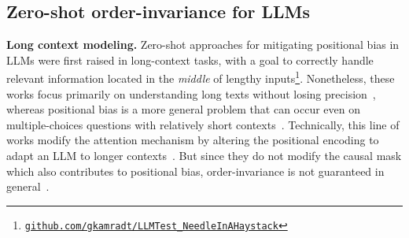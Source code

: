 \subsection{Zero-shot order-invariance for LLMs}
\label{related_work:orderinv}
\textbf{Long context modeling.} Zero-shot approaches for mitigating positional bias in LLMs were first raised in long-context tasks, with a goal to correctly handle relevant information located in the \textit{middle} of lengthy inputs\footnote{\href{https://github.com/gkamradt/LLMTest_NeedleInAHaystack}{\texttt{github.com/gkamradt/LLMTest\_NeedleInAHaystack}}}. Nonetheless, these works focus primarily on understanding long texts without losing precision~\cite{li2023loogle, marathon, leval, longbench}, whereas positional bias is a more general problem that can occur even on multiple-choices questions with relatively short contexts~\cite{alzahrani2024benchmarkstargetsrevealingsensitivity}. Technically, this line of works modify the attention mechanism by altering the positional encoding to adapt an LLM to longer contexts~\cite{peng2023yarn, hsieh2024found, peysakhovich2023attention,chen2023fortify, junqing2023never,xu2023retrieval, yu2024mitigate, zhang2024found}. But since they do not modify the causal mask which also contributes to positional bias, order-invariance is not guaranteed in general~\cite{haviv2022transformerlanguagemodelspositional}.

